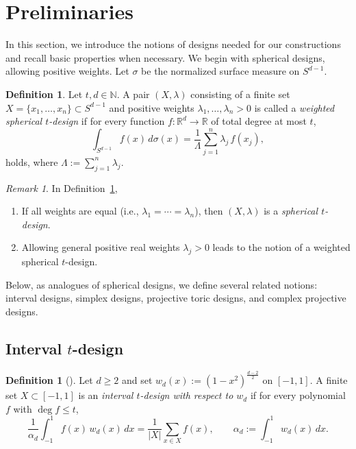 \documentclass{amsart}
\theoremstyle{definition}
\newtheorem{definition}[theorem]{Definition}
\theoremstyle{remark}
\newtheorem{remark}[theorem]{Remark}
\numberwithin{equation}{section}
\newcommand{\R}{{\mathbb R}}
\newcommand{\N}{{\mathbb N}}
\begin{document}
\section{Preliminaries}
In this section, we introduce the notions of designs needed for our constructions and recall basic properties when necessary.
We begin with spherical designs, allowing positive weights. Let $\sigma$ be the normalized surface measure on $S^{d-1}$.

\begin{definition}\label{def:weighted-sph-design}
Let $t,d\in\N$.
A pair $(X,\lambda)$ consisting of a finite set $X=\{x_1,\dots,x_n\}\subset S^{d-1}$ and positive weights
$\lambda_1,\dots,\lambda_n>0$ is called a \emph{weighted spherical $t$-design} if for every function
$f:\R^d\to\R$ of total degree at most $t$,
\[
\int_{S^{d-1}} f(x)\,d\sigma(x)
=
\frac{1}{\Lambda}\sum_{j=1}^n \lambda_j\, f(x_j)
,
\]
holds, where $\Lambda:=\sum_{j=1}^n \lambda_j$.
\end{definition}

\begin{remark}\label{rem:weight-cases}
In Definition~\ref{def:weighted-sph-design},
\begin{enumerate}
\item[(i)]
If all weights are equal (i.e., $\lambda_1=\cdots=\lambda_n$), then $(X,\lambda)$ is a \emph{spherical $t$-design}.
\item[(ii)]
Allowing general positive real weights $\lambda_j>0$ leads to the notion of a weighted spherical $t$-design.
\end{enumerate}
\end{remark}
Below, as analogues of spherical designs, we define several related notions: interval designs, simplex designs, projective toric designs, and complex projective designs.


\subsection{Interval $t$-design}
\begin{definition}[{\cite[Sec.~1]{Nishimura2003}}]\label{def:interval_t_design}
Let $d\ge2$ and set $w_d(x):=(1-x^2)^{\frac{d-2}{2}}$ on $[-1,1]$.
A finite set $X\subset[-1,1]$ is an \emph{interval $t$-design with respect to $w_d$} if for every polynomial $f$ with
$\deg f\le t$,
\[
\frac{1}{\alpha_d}\int_{-1}^{1} f(x)\,w_d(x)\,dx
=
\frac{1}{|X|}\sum_{x\in X} f(x),
\qquad
\alpha_d:=\int_{-1}^{1} w_d(x)\,dx.
\]
\end{definition}
\end{document}
